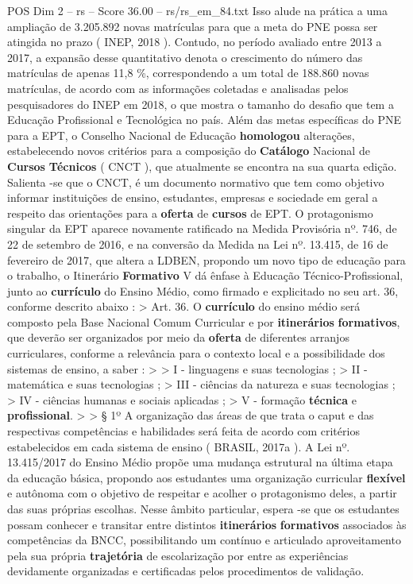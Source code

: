 \begin{textsample}{POS Dim 2 – rs – Score 36.00 – rs/rs\_em\_84.txt}
Isso alude na prática a uma ampliação de 3.205.892 novas matrículas para que a meta do PNE possa ser atingida no prazo ( INEP, 2018 ).
Contudo, no período avaliado entre 2013 a 2017, a expansão desse quantitativo denota o crescimento do número das matrículas de apenas 11,8 \%, correspondendo a um total de 188.860 novas matrículas, de acordo com as informações coletadas e analisadas pelos pesquisadores do INEP em 2018, o que mostra o tamanho do desafio que tem a Educação Profissional e Tecnológica no país.
Além das metas específicas do PNE para a EPT, o Conselho Nacional de Educação \textbf{homologou} alterações, estabelecendo novos critérios para a composição do \textbf{Catálogo} Nacional de \textbf{Cursos} \textbf{Técnicos} ( CNCT ), que atualmente se encontra na sua quarta edição.
Salienta -se que o CNCT, é um documento normativo que tem como objetivo informar instituições de ensino, estudantes, empresas e sociedade em geral a respeito das orientações para a \textbf{oferta} de \textbf{cursos} de EPT.
O protagonismo singular da EPT aparece novamente ratificado na Medida Provisória nº. 746, de 22 de setembro de 2016, e na conversão da Medida na Lei nº. 13.415, de 16 de fevereiro de 2017, que altera a LDBEN, propondo um novo tipo de educação para o trabalho, o Itinerário \textbf{Formativo} V dá ênfase à Educação Técnico-Profissional, junto ao \textbf{currículo} do Ensino Médio, como firmado e explicitado no seu art. 36, conforme descrito abaixo : > Art. 36.
O \textbf{currículo} do ensino médio será composto pela Base Nacional Comum Curricular e por \textbf{itinerários} \textbf{formativos}, que deverão ser organizados por meio da \textbf{oferta} de diferentes arranjos curriculares, conforme a relevância para o contexto local e a possibilidade dos sistemas de ensino, a saber : > > I - linguagens e suas tecnologias ; > II - matemática e suas tecnologias ; > III - ciências da natureza e suas tecnologias ; > IV - ciências humanas e sociais aplicadas ; > V - formação \textbf{técnica} e \textbf{profissional}. > > § 1º A organização das áreas de que trata o caput e das respectivas competências e habilidades será feita de acordo com critérios estabelecidos em cada sistema de ensino ( BRASIL, 2017a ).
A Lei nº. 13.415/2017 do Ensino Médio propõe uma mudança estrutural na última etapa da educação básica, propondo aos estudantes uma organização curricular \textbf{flexível} e autônoma com o objetivo de respeitar e acolher o protagonismo deles, a partir das suas próprias escolhas.
Nesse âmbito particular, espera -se que os estudantes possam conhecer e transitar entre distintos \textbf{itinerários} \textbf{formativos} associados às competências da BNCC, possibilitando um contínuo e articulado aproveitamento pela sua própria \textbf{trajetória} de escolarização por entre as experiências devidamente organizadas e certificadas pelos procedimentos de validação.

\end{textsample}

